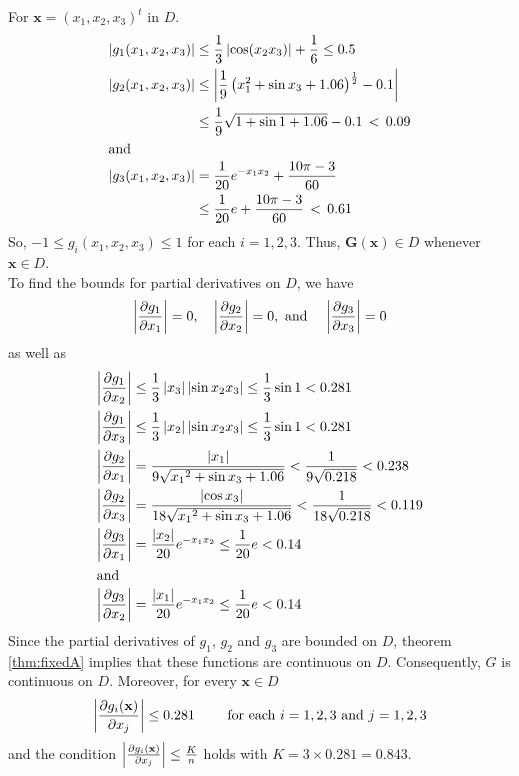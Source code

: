 \documentclass[../main-sheet.tex]{subfiles}
\begin{document}
\begin{ex}
    For \(\mathbf{x}=(x_1,x_2,x_3)^t\) in \(D\).
    \begin{align*}
        \left\vert g_1(x_1,x_2,x_3)\right\vert&\leq \frac{1}{3}\left\vert\cos(x_2x_3)\right\vert+\frac{1}{6}\leq 0.5\\
        \left\vert g_2(x_1,x_2,x_3)\right\vert&\leq \left\vert\frac{1}{9}\left(x_1^2+\sin x_3+1.06\right)^{\frac{1}{2}}-0.1\right\vert\\
        &\leq \frac{1}{9}\sqrt{1+\sin 1+1.06}-0.1\,<\,0.09\\
        \intertext{and}
        \left\vert g_3(x_1,x_2,x_3)\right\vert&=\frac{1}{20}e^{-x_1x_2}+\frac{10\pi -3}{60}\\
        &\leq \frac{1}{20}e+\frac{10\pi -3}{60}\,<\,0.61
    \end{align*}
    So, \(-1\leq g_i(x_1,x_2,x_3)\leq 1\) for each \(i=1,2,3\). Thus, \(\mathbf{G}(\mathbf{x})\in D\) whenever \(\mathbf{x}\in D\).\\
    To find the bounds for partial derivatives on \(D\), we have
    \[
        \left\vert\frac{\partial g_1}{\partial x_1}\right\vert=0,\quad\left\vert\frac{\partial g_2}{\partial x_2}\right\vert=0,\text{ and }\;\;\;\left\vert\frac{\partial g_3}{\partial x_3}\right\vert=0
    \]
    as well as 
    \begin{align*}
        \left\vert\frac{\partial g_1}{\partial x_2}\right\vert&\leq \frac{1}{3}\left\vert x_3\right\vert \left\vert\sin x_2x_3\right\vert\leq\frac{1}{3}\sin 1< 0.281\\
        \left\vert\frac{\partial g_1}{\partial x_3}\right\vert&\leq \frac{1}{3}\left\vert x_2\right\vert \left\vert\sin x_2x_3\right\vert\leq\frac{1}{3}\sin 1< 0.281\\
        \left\vert\frac{\partial g_2}{\partial x_1}\right\vert&= \frac{\left\vert x_1\right\vert}{9\sqrt{{x_1}^2+\sin x_3+1.06}}<\frac{1}{9\sqrt{0.218}}< 0.238\\
        \left\vert\frac{\partial g_2}{\partial x_3}\right\vert&= \frac{\left\vert\cos x_3\right\vert}{18\sqrt{{x_1}^2+\sin x_3+1.06}}<\frac{1}{18\sqrt{0.218}}< 0.119\\
        \left\vert\frac{\partial g_3}{\partial x_1}\right\vert&= \frac{\left\vert x_2\right\vert}{20}e^{-x_1x_2}\leq \frac{1}{20}e<0.14\\
        \intertext{and}
        \left\vert\frac{\partial g_3}{\partial x_2}\right\vert&= \frac{\left\vert x_1\right\vert}{20}e^{-x_1x_2}\leq \frac{1}{20}e<0.14
    \end{align*}
    Since the partial derivatives of \(g_1\), \(g_2\) and \(g_3\) are bounded on \(D\), theorem \ref{thm:fixedA} implies that these functions are continuous on \(D\). Consequently, \(G\) is continuous on \(D\). Moreover, for every \(\mathbf{x}\in D\)
    \[
        \left\vert\frac{\partial g_i (\mathbf{x})}{\partial x_j}\right\vert\leq 0.281\qquad \text{ for each }i=1,2,3 \text{ and }j=1,2,3
    \]
    and the condition \(\left\vert\frac{\partial g_i (\mathbf{x})}{\partial x_j}\right\vert\leq \frac{K}{n}\) holds with \(K=3\times 0.281=0.843\).



\end{ex}
\end{document}
